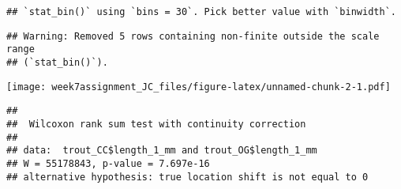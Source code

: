 \documentclass[
]{article}
\newenvironment{Shaded}{\begin{snugshade}}{\end{snugshade}}
\newcommand{\AttributeTok}[1]{\textcolor[rgb]{0.13,0.29,0.53}{#1}}
\newcommand{\CommentTok}[1]{\textcolor[rgb]{0.56,0.35,0.01}{\textit{#1}}}
\newcommand{\ConstantTok}[1]{\textcolor[rgb]{0.56,0.35,0.01}{#1}}
\newcommand{\FunctionTok}[1]{\textcolor[rgb]{0.13,0.29,0.53}{\textbf{#1}}}
\newcommand{\NormalTok}[1]{#1}
\newcommand{\OtherTok}[1]{\textcolor[rgb]{0.56,0.35,0.01}{#1}}
\newcommand{\SpecialCharTok}[1]{\textcolor[rgb]{0.81,0.36,0.00}{\textbf{#1}}}
\newcommand{\StringTok}[1]{\textcolor[rgb]{0.31,0.60,0.02}{#1}}
\begin{document}
\begin{verbatim}
## `stat_bin()` using `bins = 30`. Pick better value with `binwidth`.
\end{verbatim}

\begin{verbatim}
## Warning: Removed 5 rows containing non-finite outside the scale range
## (`stat_bin()`).
\end{verbatim}

\texttt{[image: week7assignment\_JC\_files/figure-latex/unnamed-chunk-2-1.pdf]}

\begin{Shaded}
\end{Shaded}

\begin{verbatim}
## 
##  Wilcoxon rank sum test with continuity correction
## 
## data:  trout_CC$length_1_mm and trout_OG$length_1_mm
## W = 55178843, p-value = 7.697e-16
## alternative hypothesis: true location shift is not equal to 0
\end{verbatim}

\begin{Shaded}
\end{Shaded}
\end{document}
